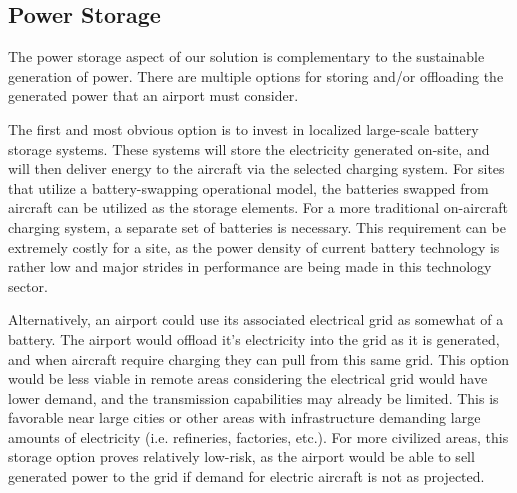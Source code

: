 \documentclass[../main.tex]{subfiles}
\begin{document}
\subsection{Power Storage} %
The power storage aspect of our solution is complementary to the sustainable generation of power.  There are multiple options for storing and/or offloading the generated power that an airport must consider.\par 

The first and most obvious option is to invest in localized large-scale battery storage systems. These systems will store the electricity generated on-site, and will then deliver energy to the aircraft via the selected charging system. For sites that utilize a battery-swapping operational model, the batteries swapped from aircraft can be utilized as the storage elements. For a more traditional on-aircraft charging system, a separate set of batteries is necessary. This requirement can be extremely costly for a site, as the power density of current battery technology is rather low and major strides in performance are being made in this technology sector.\par
Alternatively, an airport could use its associated electrical grid as somewhat of a battery. The airport would offload it's  electricity into the grid as it is generated, and when aircraft require charging they can pull from this same grid. This option would be less viable in remote areas considering the electrical grid would have lower demand, and the transmission capabilities may already be limited. This is favorable near large cities or other areas with infrastructure demanding large amounts of electricity (i.e. refineries, factories, etc.). For more civilized areas, this storage option proves relatively low-risk, as the airport would be able to sell generated power to the grid if demand for electric aircraft is not as projected.\par
\newpage
\end{document}
